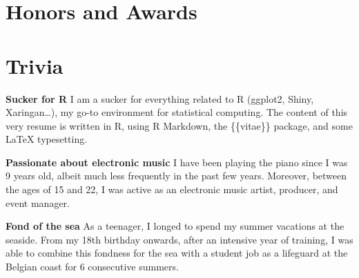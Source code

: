 \documentclass[11pt,a4paper,]{awesome-cv}
\begin{document}
\hypertarget{honors-and-awards}{%
\section{Honors and Awards}\label{honors-and-awards}}

\medskip
\begin{cvhonors}
\end{cvhonors}

\hypertarget{trivia}{%
\section{Trivia}\label{trivia}}

\medskip
\footnotesize

\textbf{Sucker for R} \newline I am a sucker for everything related to R
(ggplot2, Shiny, Xaringan\ldots), my go-to environment for statistical
computing. The content of this very resume is written in R, using R
Markdown, the \{\{vitae\}\} package, and some LaTeX typesetting.

\footnotesize

\textbf{Passionate about electronic music} \newline I have been playing
the piano since I was 9 years old, albeit much less frequently in the
past few years. Moreover, between the ages of 15 and 22, I was active as
an electronic music artist, producer, and event manager.

\textbf{Fond of the sea} \newline As a teenager, I longed to spend my
summer vacations at the seaside. From my 18th birthday onwards, after an
intensive year of training, I was able to combine this fondness for the
sea with a student job as a lifeguard at the Belgian coast for 6
consecutive summers.

\normalsize


\label{LastPage}~
\end{document}

